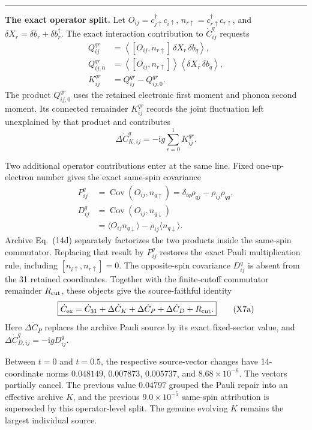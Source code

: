 \documentclass[10pt,letterpaper,twocolumn]{article}
\newcommand{\ii}{\mathrm i}
\newcommand{\conceptbreak}{%
  \par\medskip\noindent
  {\color{black!30}\rule{\columnwidth}{0.35pt}}%
  \par\medskip
}
\begin{document}
\conceptbreak
\textbf{The exact operator split.}
Let \(O_{ij}=c_{j\uparrow}^\dagger c_{i\uparrow}\),
\(n_{r\uparrow}=c_{r\uparrow}^\dagger c_{r\uparrow}\), and
\(\delta X_r=\delta b_r+\delta b_r^\dagger\).  The exact interaction
contribution to \(\dot C^q_{ij}\) requests
\[
\begin{aligned}
Q^{qr}_{ij}
&=\left\langle
[O_{ij},n_{r\uparrow}]\,\delta X_r\,\delta b_q
\right\rangle,\\
Q^{qr}_{ij,0}
&=\left\langle[O_{ij},n_{r\uparrow}]\right\rangle
\left\langle\delta X_r\,\delta b_q\right\rangle,\\
K^{qr}_{ij}&=Q^{qr}_{ij}-Q^{qr}_{ij,0}.
\end{aligned}
\tag{X5}
\]
The product \(Q^{qr}_{ij,0}\) uses the retained electronic first moment and
phonon second moment.  Its connected remainder \(K^{qr}_{ij}\) records the
joint fluctuation left unexplained by that product and contributes
\[
\Delta\dot C^q_{K,ij}
=-\ii g\sum_{r=0}^{1}K^{qr}_{ij}.
\tag{X6}
\]

Two additional operator contributions enter at the same line.  Fixed
one-up-electron number gives the exact same-spin covariance
\[
\begin{aligned}
P^q_{ij}
&=\operatorname{Cov}(O_{ij},n_{q\uparrow})
=\delta_{iq}\rho_{qj}-\rho_{ij}\rho_{qq},\\
D^q_{ij}
&=\operatorname{Cov}(O_{ij},n_{q\downarrow})\\
&=\langle O_{ij}n_{q\downarrow}\rangle
-\rho_{ij}\langle n_{q\downarrow}\rangle .
\end{aligned}
\tag{X7}
\]
Archive Eq.~(14d) separately factorizes the two products inside the
same-spin commutator.  Replacing that result by \(P^q_{ij}\) restores the
exact Pauli multiplication rule, including
\([n_{i\uparrow},n_{r\uparrow}]=0\).  The opposite-spin covariance
\(D^q_{ij}\) is absent from the 31 retained coordinates.  Together with the
finite-cutoff commutator remainder \(R_{\rm cut}\), these objects give the
source-faithful identity
\[
\boxed{
\dot C_{\rm ex}
=\dot C_{31}
+\Delta\dot C_K
+\Delta\dot C_P
+\Delta\dot C_D
+R_{\rm cut}.}
\tag{X7a}
\]
Here \(\Delta\dot C_P\) replaces the archive Pauli source by its exact
fixed-sector value, and
\(\Delta\dot C^q_{D,ij}=-\ii gD^q_{ij}\).

Between \(t=0\) and \(t=0.5\), the respective source-vector changes have
14-coordinate norms \(0.048149\), \(0.007873\), \(0.005737\), and
\(8.68\times10^{-6}\).  The vectors partially cancel.  The previous value
\(0.04797\) grouped the Pauli repair into an effective archive \(K\), and the
previous \(9.0\times10^{-5}\) same-spin attribution is superseded by this
operator-level split.  The genuine evolving \(K\) remains the largest
individual source.
\end{document}
